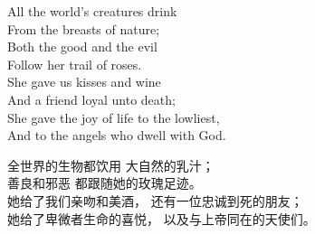 \begin{paracol}{4}
\begin{Everse}
All the world's creatures drink\\
From the breasts of nature;\\
Both the good and the evil\\
Follow her trail of roses.\\
She gave us kisses and wine\\
And a friend loyal unto death;\\
She gave the joy of life to the lowliest,\\
And to the angels who dwell with God. 
\end{Everse}
\begin{CEverse}
全世界的生物都饮用
大自然的乳汁；\\
善良和邪恶
都跟随她的玫瑰足迹。\\
她给了我们亲吻和美酒，
还有一位忠诚到死的朋友；\\
她给了卑微者生命的喜悦，
以及与上帝同在的天使们。
\end{CEverse}


\end{paracol}
